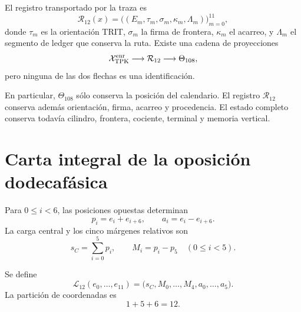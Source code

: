 \begin{definition}
\label{def:registro-enriquecido-dodecafasico}
El registro transportado por la traza es
\[
 \mathcal R_{12}(x)=
 \bigl((E_m,\tau_m,\sigma_m,\kappa_m,\Lambda_m)\bigr)_{m=0}^{11},
\]
donde \(\tau_m\) es la orientación TRIT, \(\sigma_m\) la firma de
frontera, \(\kappa_m\) el acarreo, y \(\Lambda_m\) el segmento de ledger
que conserva la ruta. Existe una cadena de proyecciones
\[
 \mathcal X_{\rm TPK}^{\rm enr}
 \longrightarrow\mathcal R_{12}
 \longrightarrow\Theta_{108},
\]
pero ninguna de las dos flechas es una identificación.
\end{definition}

En particular, \(\Theta_{108}\) sólo conserva la posición del calendario.
El registro \(\mathcal R_{12}\) conserva además orientación, firma,
acarreo y procedencia. El estado completo conserva todavía cilindro,
frontera, cociente, terminal y memoria vertical.

\section{Carta integral de la oposición dodecafásica}

Para \(0\leq i<6\), las posiciones opuestas determinan
\begin{equation}
 p_i=e_i+e_{i+6},
 \qquad
 a_i=e_i-e_{i+6}.
 \label{eq:pares-opuestos-registro}
\end{equation}
La carga central y los cinco márgenes relativos son
\begin{equation}
 s_C=\sum_{i=0}^{5}p_i,
 \qquad
 M_i=p_i-p_5\quad(0\leq i<5).
 \label{eq:carga-margenes-registro}
\end{equation}

\begin{definition}
\label{def:carta-integral-156}
Se define
\begin{equation}
 \mathcal L_{12}(e_0,\ldots,e_{11})
 =\bigl(s_C,M_0,\ldots,M_4,a_0,\ldots,a_5\bigr).
 \label{eq:carta-integral-156}
\end{equation}
La partición de coordenadas es
\[
 1+5+6=12.
\]
\end{definition}

